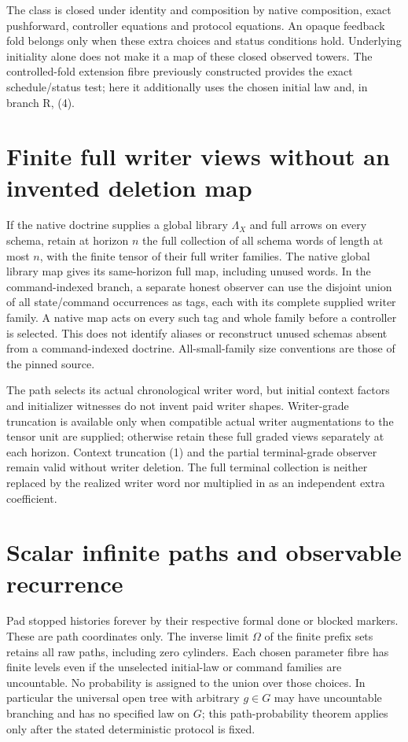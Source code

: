 \documentclass[11pt]{article}
\begin{document}
The class is closed under identity and composition by native composition, exact pushforward, controller equations and protocol equations. An opaque feedback fold belongs only when these extra choices and status conditions hold. Underlying initiality alone does not make it a map of these closed observed towers. The controlled-fold extension fibre previously constructed provides the exact schedule/status test; here it additionally uses the chosen initial law and, in branch R, (4).

\section{Finite full writer views without an invented deletion map}
If the native doctrine supplies a global library $\Lambda_X$ and full arrows on every schema, retain at horizon $n$ the full collection of all schema words of length at most $n$, with the finite tensor of their full writer families. The native global library map gives its same-horizon full map, including unused words. In the command-indexed branch, a separate honest observer can use the disjoint union of all state/command occurrences as tags, each with its complete supplied writer family. A native map acts on every such tag and whole family before a controller is selected. This does not identify aliases or reconstruct unused schemas absent from a command-indexed doctrine. All-small-family size conventions are those of the pinned source.

The path selects its actual chronological writer word, but initial context factors and initializer witnesses do not invent paid writer shapes. Writer-grade truncation is available only when compatible actual writer augmentations to the tensor unit are supplied; otherwise retain these full graded views separately at each horizon. Context truncation (1) and the partial terminal-grade observer remain valid without writer deletion. The full terminal collection is neither replaced by the realized writer word nor multiplied in as an independent extra coefficient.

\section{Scalar infinite paths and observable recurrence}
Pad stopped histories forever by their respective formal done or blocked markers. These are path coordinates only. The inverse limit $\Omega$ of the finite prefix sets retains all raw paths, including zero cylinders. Each chosen parameter fibre has finite levels even if the unselected initial-law or command families are uncountable. No probability is assigned to the union over those choices. In particular the universal open tree with arbitrary $g\in G$ may have uncountable branching and has no specified law on $G$; this path-probability theorem applies only after the stated deterministic protocol is fixed.
\end{document}

